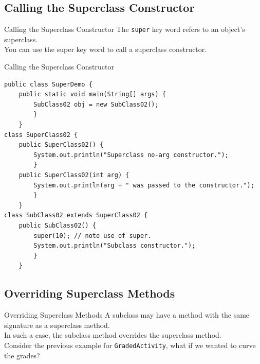 \documentclass[11pt]{beamer}
\begin{document}
\subsection{Calling the Superclass Constructor}
\begin{frame}{Calling the Superclass Constructor}
    The \texttt{super} key word refers to an object’s superclass. \\ \vspace{1em}
    You can use the super key word to call a superclass constructor. \\ \vspace{1em}
\end{frame}

\begin{frame}[fragile]{Calling the Superclass Constructor}
\begin{lstlisting}[basicstyle=\ttfamily\footnotesize]
public class SuperDemo {
    public static void main(String[] args) {
        SubClass02 obj = new SubClass02();
        }
    }
class SuperClass02 {
	public SuperClass02() {
		System.out.println("Superclass no-arg constructor.");
		}
	public SuperClass02(int arg) {
		System.out.println(arg + " was passed to the constructor.");
		}
	}
class SubClass02 extends SuperClass02 {
	public SubClass02() {
		super(10); // note use of super.
		System.out.println("Subclass constructor.");
		}
	}
\end{lstlisting}    
\end{frame}

\subsection{Overriding Superclass Methods}
\begin{frame}{Overriding Superclass Methods}
    A subclass may have a method with the same signature as a superclass method. \\ \vspace{1em}
    In such a case, the subclass method overrides the superclass method. \\ \vspace{1em}
    Consider the previous example for \texttt{GradedActivity}, what if we wanted to curve the grades?
\end{frame}
\end{document}
